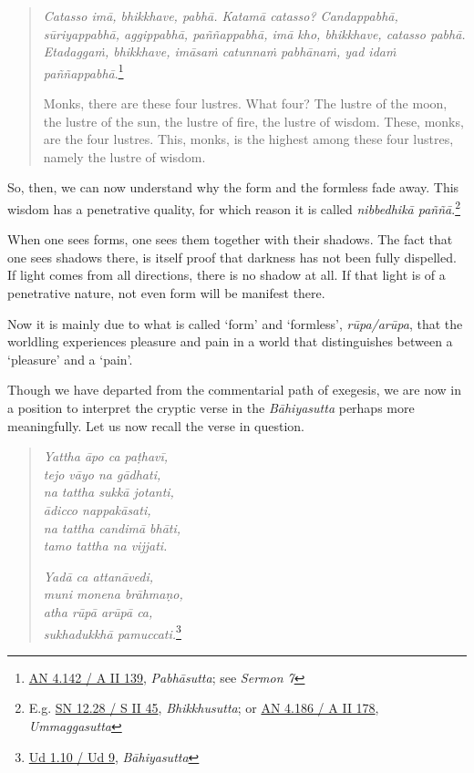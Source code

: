 \begin{quote}
\emph{Catasso imā, bhikkhave, pabhā. Katamā catasso? Candappabhā, sūriyappabhā, aggippabhā, paññappabhā, imā kho, bhikkhave, catasso pabhā. Etadaggaṁ, bhikkhave, imāsaṁ catunnaṁ pabhānaṁ, yad idaṁ paññappabhā}.\footnote{\href{https://suttacentral.net/an4.142/pli/ms}{AN 4.142 / A II 139}, \emph{Pabhāsutta}; see \emph{Sermon 7}}

Monks, there are these four lustres. What four? The lustre of the moon, the lustre of the sun, the lustre of fire, the lustre of wisdom. These, monks, are the four lustres. This, monks, is the highest among these four lustres, namely the lustre of wisdom.
\end{quote}

So, then, we can now understand why the form and the formless fade away. This wisdom has a penetrative quality, for which reason it is called \emph{nibbedhikā paññā}.\footnote{E.g. \href{https://suttacentral.net/sn12.28/pli/ms}{SN 12.28 / S II 45}, \emph{Bhikkhusutta}; or \href{https://suttacentral.net/an4.186/pli/ms}{AN 4.186 / A II 178}, \emph{Ummaggasutta}}

When one sees forms, one sees them together with their shadows. The fact that one sees shadows there, is itself proof that darkness has not been fully dispelled. If light comes from all directions, there is no shadow at all. If that light is of a penetrative nature, not even form will be manifest there.

Now it is mainly due to what is called `form' and `formless', \emph{rūpa/arūpa}, that the worldling experiences pleasure and pain in a world that distinguishes between a `pleasure' and a `pain'.

Though we have departed from the commentarial path of exegesis, we are now in a position to interpret the cryptic verse in the \emph{Bāhiyasutta} perhaps more meaningfully. Let us now recall the verse in question.

\begin{quote}
\emph{Yattha āpo ca paṭhavī,}\\
\emph{tejo vāyo na gādhati,}\\
\emph{na tattha sukkā jotanti,}\\
\emph{ādicco nappakāsati,}\\
\emph{na tattha candimā bhāti,}\\
\emph{tamo tattha na vijjati.}

\emph{Yadā ca attanāvedi,}\\
\emph{muni monena brāhmaṇo,}\\
\emph{atha rūpā arūpā ca,}\\
\emph{sukhadukkhā pamuccati.}\footnote{\href{https://suttacentral.net/ud1.10/pli/ms}{Ud 1.10 / Ud 9}, \emph{Bāhiyasutta}}
\end{quote}

